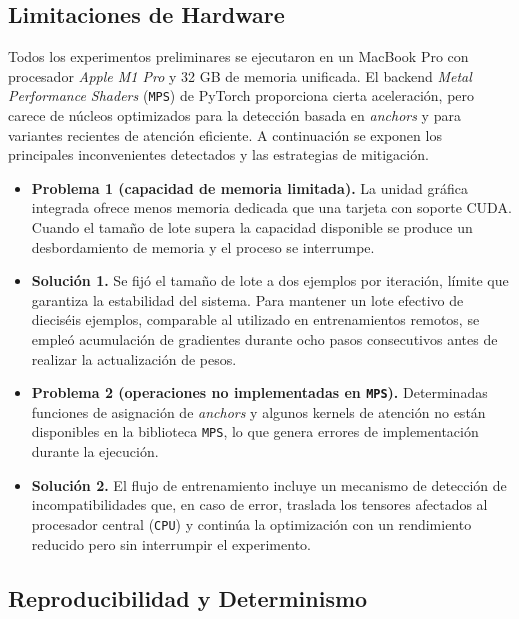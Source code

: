 \subsection{Limitaciones de Hardware}\label{ssec:hw_local}

Todos los experimentos preliminares se ejecutaron en un MacBook Pro con procesador \textit{Apple M1 Pro} y 32 GB de memoria unificada.
El backend \textit{Metal Performance Shaders} (\texttt{MPS}) de PyTorch proporciona cierta aceleración, pero carece de núcleos optimizados para la detección basada en \emph{anchors} y para variantes recientes de atención eficiente.
A continuación se exponen los principales inconvenientes detectados y las estrategias de mitigación.

\begin{itemize}
  \item \textbf{Problema 1 (capacidad de memoria limitada).}
        La unidad gráfica integrada ofrece menos memoria dedicada que una tarjeta con soporte \textsc{CUDA}.
        Cuando el tamaño de lote supera la capacidad disponible se produce un desbordamiento de memoria y el proceso se interrumpe.

  \item \textbf{Solución 1.}
        Se fijó el tamaño de lote a dos ejemplos por iteración, límite que garantiza la estabilidad del sistema.
        Para mantener un lote efectivo de dieciséis ejemplos, comparable al utilizado en entrenamientos remotos, se empleó acumulación de gradientes durante ocho pasos consecutivos antes de realizar la actualización de pesos.

  \item \textbf{Problema 2 (operaciones no implementadas en \texttt{MPS}).}
        Determinadas funciones de asignación de \emph{anchors} y algunos kernels de atención no están disponibles en la biblioteca \texttt{MPS}, lo que genera errores de implementación durante la ejecución.

  \item \textbf{Solución 2.}
        El flujo de entrenamiento incluye un mecanismo de detección de incompatibilidades que, en caso de error, traslada los tensores afectados al procesador central (\texttt{CPU}) y continúa la optimización con un rendimiento reducido pero sin interrumpir el experimento.
\end{itemize}

\subsection{Reproducibilidad y Determinismo}

